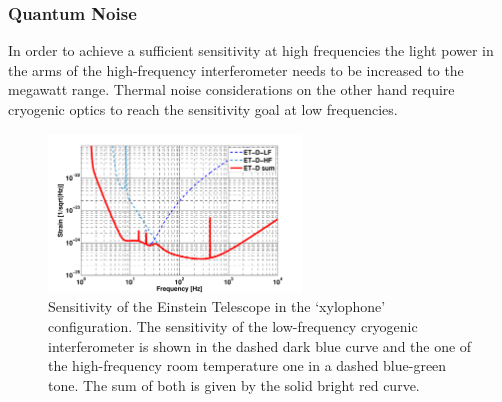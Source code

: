 \subsubsection{Quantum Noise} 
In order to achieve a sufficient sensitivity at high frequencies the light power in 
the arms of the high-frequency interferometer needs to be increased to the 
megawatt range. Thermal noise considerations on the other hand require cryogenic 
optics to reach the sensitivity goal at low frequencies. 

\begin{figure}
	\centering
		\includegraphics[width=0.6\textwidth]{Intro/Intro_Figures/ET_D_spectrum.pdf}
	\caption{Sensitivity of the Einstein Telescope in the `xylophone' configuration. 
	The sensitivity of the low-frequency cryogenic interferometer is shown in the 
	dashed dark blue curve and the one of the high-frequency room temperature 
	one in a dashed blue-green tone. The sum of both is given by the solid bright red curve.}
	\label{fig:ET_sensitivity}
\end{figure}

